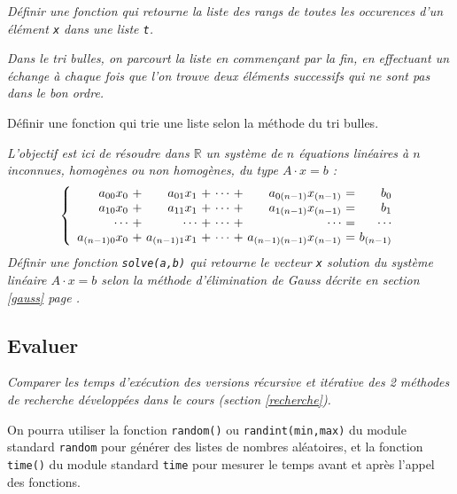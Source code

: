 \begin{td}\label{td:occurs}
\em
Définir une fonction qui retourne la liste des rangs de toutes les occurences
d'un élément {\tt x} dans une liste {\tt t}.
\end{td}

\begin{td}\label{td:bulles}
\em
Dans le tri bulles, on parcourt la liste en commençant par la fin, en effectuant un échange à
chaque fois que l'on trouve deux éléments successifs qui ne sont pas dans le bon ordre.

\noindent Définir une fonction qui trie une liste selon la méthode du tri bulles.
\end{td}

\begin{td}\label{td:gauss}
\em
L'objectif est ici de 
résoudre dans $\mathbb{R}$ un système de $n$ équations linéaires
à $n$ inconnues, homogènes ou non homogènes, du type $A\cdot x = b$ :
$$\left\{
\begin{array}{r@{\ +\ }r@{\ +\ }r@{\ +\ }r@{\ =\ }r}
a_{00}x_0     & a_{01}x_1     & \cdots & a_{0(n-1)}x_{(n-1)}     & b_0      \\
a_{10}x_0     & a_{11}x_1     & \cdots & a_{1(n-1)}x_{(n-1)}     & b_1      \\
\cdots        & \cdots        & \cdots & \cdots                  & \cdots   \\
a_{(n-1)0}x_0 & a_{(n-1)1}x_1 & \cdots & a_{(n-1)(n-1)}x_{(n-1)} & b_{(n-1)}
\end{array}
\right.$$
Définir une fonction {\tt solve(a,b)} qui retourne le vecteur {\tt x}
solution du système linéaire $A\cdot x = b$ selon la méthode d'élimination de 
{\sc Gauss} décrite en section \ref{gauss} page \pageref{gauss}.
\end{td}

\subsection{Evaluer}
\begin{td}\label{td:exectri2}
\em
Comparer les temps d'exécution des versions récursive et itérative des
2 méthodes de recherche développées dans le cours (section \ref{recherche}).

On pourra utiliser la fonction {\tt random()} ou {\tt randint(min,max)} du module standard
{\tt random} pour générer des listes de nombres aléatoires, et la fonction {\tt time()}
du module standard {\tt time} pour mesurer le temps avant et après l'appel des
fonctions.
\end{td}

